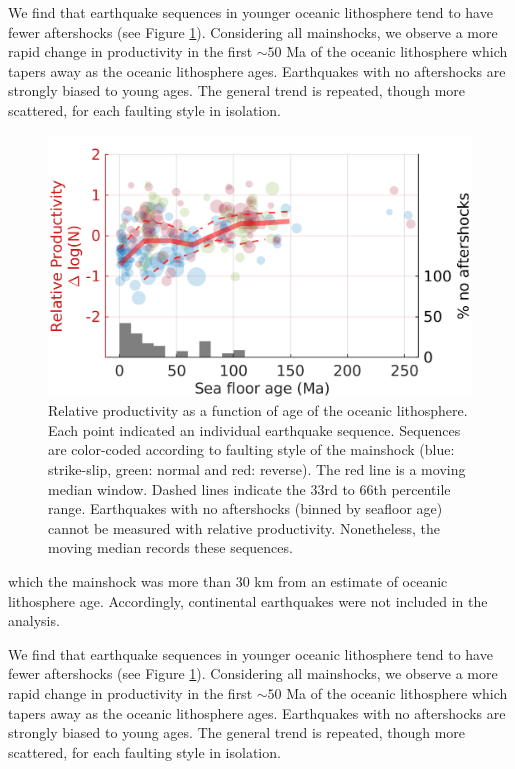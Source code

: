 \documentclass[12pt, notitlepage]{report}
\begin{document}
We find that earthquake sequences in younger oceanic lithosphere tend to have fewer aftershocks (see Figure \ref{fig:prod_vs_age}). Considering all mainshocks, we observe a more rapid change in productivity in the first $\sim 50$ Ma of the oceanic lithosphere which tapers away as the oceanic lithosphere ages. Earthquakes with no aftershocks are strongly biased to young ages. The general trend is repeated, though more scattered, for each faulting style in isolation.

\begin{figure}
    \centering
    \includegraphics{figures/prod_vs_age.png}
    \caption{Relative productivity as a function of age of the oceanic lithosphere. Each point indicated an individual earthquake sequence. Sequences are color-coded according to faulting style of the mainshock (blue: strike-slip, green: normal and red: reverse). The red line is a moving median window. Dashed lines indicate the 33rd to 66th percentile range. Earthquakes with no aftershocks (binned by seafloor age) cannot be measured with relative productivity. Nonetheless, the moving median records these sequences.}
    \label{fig:prod_vs_age}
\end{figure}
which the mainshock was more than 30 km from an estimate of oceanic lithosphere age. Accordingly, continental earthquakes were not included in the analysis. 

We find that earthquake sequences in younger oceanic lithosphere tend to have fewer aftershocks (see Figure \ref{fig:prod_vs_age}). Considering all mainshocks, we observe a more rapid change in productivity in the first $\sim 50$ Ma of the oceanic lithosphere which tapers away as the oceanic lithosphere ages. Earthquakes with no aftershocks are strongly biased to young ages. The general trend is repeated, though more scattered, for each faulting style in isolation.
\end{document}
